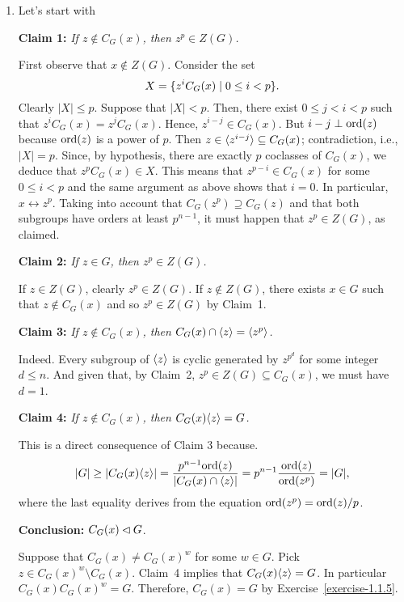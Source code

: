 \begin{solution}
\begin{enumerate}[\rm a)]
    \item Let's start with 
    
    \textbf{Claim 1:} \textit{If\/ $z\notin C_G(x)$, then\/ $z^p\in Z(G)$.}
    
    First observe that $x\notin Z(G)$. Consider the set
    $$
        X = \{z^iC_G(x)\mid 0\le i<p\}.
    $$
    Clearly $|X|\le p$. Suppose that $|X|<p$. Then, there exist $0\le j<i<p$ such that $z^iC_G(x)=z^jC_G(x)$. Hence, $z^{i-j}\in C_G(x)$. But $i-j\perp{\rm ord}(z)$ because ${\rm ord}(z)$ is a power of $p$. Then $z\in\langle z^{i-j}\rangle\subseteq C_G(x)$; contradiction, i.e., $|X|=p$. Since, by hypothesis, there are exactly $p$ coclasses of $C_G(x)$, we deduce that $z^pC_G(x)\in X$. This means that $z^{p-i}\in C_G(x)$ for some $0\le i<p$ and the same argument as above shows that $i=0$. In particular, $x\leftrightarrow z^p$. Taking into account that $C_G(z^p)\supseteq C_G(z)$ and that both subgroups have orders at least $p^{n-1}$, it must happen that $z^p\in Z(G)$, as claimed.


    \textbf{Claim 2:} \textit{If\/ $z\in G$, then $z^p\in Z(G)$.}

    If $z\in Z(G)$, clearly $z^p\in Z(G)$. If $z\notin Z(G)$, there exists $x\in G$ such that $z\notin C_G(x)$ and so $z^p\in Z(G)$ by Claim~1.

    \textbf{Claim 3:} \textit{If\/ $z\notin C_G(x)$, then\/ $C_G(x)\cap\langle z\rangle = \langle z^p\rangle$.}
    
    Indeed. Every subgroup of $\langle z\rangle$ is cyclic generated by $z^{p^d}$ for some integer $d\le n$. And given that, by Claim~2, $z^p\in Z(G)\subseteq C_G(x)$, we must have $d=1$.
    
    \textbf{Claim 4:} \textit{If\/ $z\notin C_G(x)$, then\/ $C_G(x)\langle z\rangle=G$.}
    
    This is a direct consequence of Claim 3 because.
    $$
        |G| \ge |C_G(x)\langle z\rangle|
            = \frac{p^{n-1}{\rm ord}(z)}{|C_G(x)\cap\langle z\rangle|}
            = p^{n-1}\frac{{\rm ord}(z)}{{\rm ord}(z^p)} = |G|,
    $$
    where the last equality derives from the equation ${\rm ord}(z^p)={\rm ord}(z)/p$.

    \textbf{Conclusion:} $C_G(x)\lhd G$.

    Suppose that $C_G(x)\ne C_G(x)^w$ for some $w\in G$. Pick $z\in C_G(x)^w\setminus C_G(x)$.  Claim~4 implies that $C_G(x)\langle z\rangle=G$. In particular $C_G(x)C_G(x)^w=G$. Therefore, $C_G(x)=G$ by Exercise~\ref{exercise-1.1.5}.


\end{enumerate}
\end{solution}
